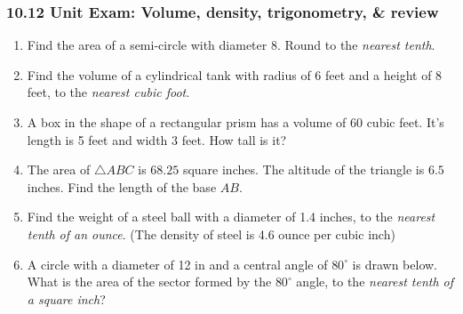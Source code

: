 \documentclass[12pt, twoside]{article}
\begin{document}
\subsubsection*{10.12 Unit Exam: Volume, density, trigonometry, \& review}
 \begin{enumerate}

  \item Find the area of a semi-circle with diameter 8. Round to the \emph{nearest tenth}.\vspace{3cm}

  \item Find the volume of a cylindrical tank with radius of $6$ feet and a height of 8 feet, to the \emph{nearest cubic foot}. \vspace{2.5cm}

  \item A box in the shape of a rectangular prism has a volume of 60 cubic feet. It's length is 5 feet and width 3 feet. How tall is it? \vspace{3.0cm}

  \item The area of $\triangle ABC$ is $68.25$ square inches. The altitude of the triangle is $6.5$ inches. Find the length of the base $AB$.\\[0.5cm]
   \vspace{0.25cm}

  \item Find the weight of a steel ball with a diameter of 1.4 inches, to the \emph{nearest tenth of an ounce}. (The density of steel is 4.6 ounce per cubic inch)

\newpage

  \item A circle with a diameter of 12 in and a central angle of $80^\circ$ is drawn below. What is the area of the sector formed by the $80^\circ$ angle, to the \emph{nearest tenth of a square inch}?\\[0.25cm]
   \vspace{0.5cm}


\end{enumerate}
\end{document}
